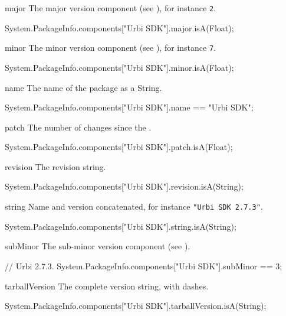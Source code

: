 \begin{urbiscriptapi}
\item[major] The major version component (see ), for
  instance \lstinline|2|.
\begin{urbiassert}
System.PackageInfo.components["Urbi SDK"].major.isA(Float);
\end{urbiassert}


\item[minor] The minor version component (see ), for
  instance \lstinline|7|.
\begin{urbiassert}
System.PackageInfo.components["Urbi SDK"].minor.isA(Float);
\end{urbiassert}


\item[name] The name of the package as a String.
\begin{urbiassert}
System.PackageInfo.components["Urbi SDK"].name
  == "Urbi SDK";
\end{urbiassert}


\item[patch] The number of changes since the .
\begin{urbiassert}
System.PackageInfo.components["Urbi SDK"].patch.isA(Float);
\end{urbiassert}


\item[revision] The revision string.
\begin{urbiassert}
System.PackageInfo.components["Urbi SDK"].revision.isA(String);
\end{urbiassert}


\item[string] Name and version concatenated, for instance
  \lstinline|"Urbi SDK 2.7.3"|.
\begin{urbiassert}
System.PackageInfo.components["Urbi SDK"].string.isA(String);
\end{urbiassert}


\item[subMinor] The sub-minor version component (see ).
\begin{urbiassert}
// Urbi 2.7.3.
System.PackageInfo.components["Urbi SDK"].subMinor
  == 3;
\end{urbiassert}


\item[tarballVersion] The complete version string, with dashes.
\begin{urbiassert}
System.PackageInfo.components["Urbi SDK"].tarballVersion.isA(String);
\end{urbiassert}



\end{urbiscriptapi}
